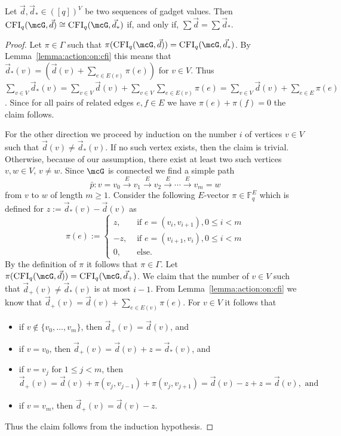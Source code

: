 \documentclass[a4paper,UKenglish]{lipics}
\newcommand{\defeq}{:=}
\newcommand{\isom}{\cong}
\newcommand{\inseg}[1]{\ensuremath{[#1]}}
\newcommand{\field}[1]{\mathbb{#1}}
\theoremstyle{plain}
\begin{document}
\begin{lemma}\label{lemma:gencfi:isoclasses}
 Let $\vec d, \vec d_* \in (\inseg q)^V$ be two sequences of gadget values.
  Then $\CFI(\mcG, \vec d) \isom \CFI(\mcG, \vec d_*)$ if, and only if, $\sum 
\vec 
d= \sum \vec d_*$.
\end{lemma}
\begin{proof}
Let $\pi \in \Gamma$ such that 
$\pi(\CFI(\mcG, \vec d)) = \CFI(\mcG, \vec d_*)$.
By Lemma~\ref{lemma:action:on:cfi} this means that 
$\vec d_*(v) = (\vec d(v) + \sum_{e \in E(v)}  \pi(e))$ for $v \in V$.
Thus $\sum_{v \in V} \vec d_*(v) = \sum_{v \in V} \vec d(v) + \sum_{v \in 
V} \sum_{e \in E(v)}  \pi(e) = \sum_{v \in V} \vec d(v) + \sum_{e \in E} 
\pi(e)$. Since for all pairs of related edges $e, f \in E$ we have $\pi(e) 
+ \pi(f) = 0$ the claim follows.

\smallskip
For the other direction we proceed by induction on the number $i$ of 
vertices $v \in V$ such that $\vec d (v) \neq \vec d_*(v)$.
If no such vertex exists, then the claim is trivial.
Otherwise, because of our assumption, there exist at least two such
vertices $v,w \in V$, $v \neq w$.
Since $\mcG$ is connected we find a simple path 
\[ \bar p: v = v_0 \stackrel{E}{\longrightarrow} v_1  
\stackrel{E}{\longrightarrow} v_2 \stackrel{E}{\longrightarrow} \cdots 
\stackrel{E}{\longrightarrow} v_{m} = w\]
from $v$ to $w$ of length $m \geq 1$.
Consider the following $E$-vector $\pi \in \field F_q^E$ which is defined for 
$z \defeq \vec d_*(v) - \vec d(v)$ as
\[
 \pi(e) \defeq \begin{cases}
          z , & \text{ if } e = (v_i, v_{i+1}), 0 \leq i < m \\
          -z, & \text{ if } e = (v_{i+1}, v_{i}), 0 \leq i < m\\         
          0, &\text{ else.}  
          \end{cases}
\]
By the definition of $\pi$ it follows that $\pi \in \Gamma$.
Let $\pi( \CFI(\mcG, \vec d) ) = \CFI(\mcG,\vec d_+)$. We claim that the 
number of $v \in V$ such that $\vec d_+(v) \neq \vec d_*(v)$ is at 
most $i-1$.
From Lemma~\ref{lemma:action:on:cfi} we know that 
$\vec d_+(v) = \vec d(v) + \sum_{e \in E(v)} \pi (e)$. For $v \in 
V$ it follows that
\begin{itemize}
 \item if $v \nin \{ v_0, \dots, v_m \}$, then $\vec d_+(v) = \vec 
d(v)$, and
 \item if $v = v_0$, then $\vec d_+(v) = \vec d(v) + z = \vec d_*(v)$, and
 \item if $v=v_j$ for $1 \leq j < m$, then
 \[\vec d_+(v) = \vec d(v) + \pi(v_{j},v_{j-1}) + \pi(v_j,v_{j+1}) = \vec 
d(v) - z + z = \vec d(v), \text{ and }\]
 \item if $v = v_m$, then $\vec d_+(v) = \vec d(v) - z$.
\end{itemize}
Thus the claim follows from the induction hypothesis.
\end{proof}
\end{document}
